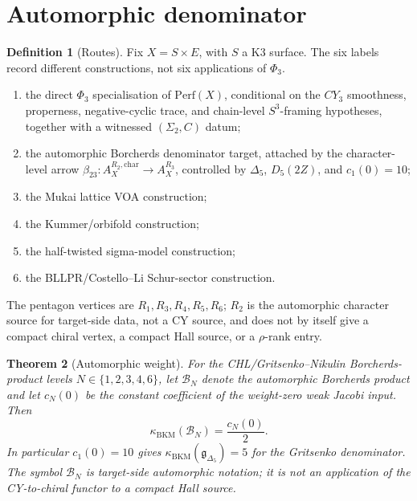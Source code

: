 \documentclass[11pt]{amsart}
\providecommand{\Perf}{\mathrm{Perf}}
\newtheorem{theorem}{Theorem}
\theoremstyle{definition}
\newtheorem{definition}[theorem]{Definition}
\theoremstyle{remark}
\begin{document}
\section{Automorphic denominator}

\begin{definition}[Routes]
Fix \(X=S\times E\), with \(S\) a K3 surface. The six labels record
different constructions, not six applications of \(\Phi_3\).
\begin{enumerate}
\item[\(R_1\)] the direct \(\Phi_3\) specialisation of \(\Perf(X)\),
conditional on the \(CY_3\) smoothness, properness, negative-cyclic trace,
and chain-level \(S^3\)-framing hypotheses, together with a witnessed
\((\Sigma_2,C)\) datum;
\item[\(R_2\)] the automorphic Borcherds denominator target, attached by
the character-level arrow
\(\beta_{23}:A_X^{R_2,\mathrm{char}}\to A_X^{R_3}\), controlled by
\(\Delta_5\), \(D_5(2Z)\), and \(c_1(0)=10\);
\item[\(R_3\)] the Mukai lattice VOA construction;
\item[\(R_4\)] the Kummer/orbifold construction;
\item[\(R_5\)] the half-twisted sigma-model construction;
\item[\(R_6\)] the BLLPR/Costello--Li Schur-sector construction.
\end{enumerate}
The pentagon vertices are \(R_1,R_3,R_4,R_5,R_6\); \(R_2\) is the
automorphic character source for target-side data, not a CY source, and
does not by itself give a compact chiral vertex, a compact Hall source, or
a \(\rho\)-rank entry.
\end{definition}

\begin{theorem}[Automorphic weight]
For the CHL/Gritsenko--Nikulin Borcherds-product levels
\(N\in\{1,2,3,4,6\}\), let \(\mathcal B_N\) denote the automorphic
Borcherds product and let \(c_N(0)\) be the constant coefficient of the
weight-zero weak Jacobi input. Then
\[
        \kappa_{\mathrm{BKM}}(\mathcal B_N)=\frac{c_N(0)}{2}.
\]
In particular \(c_1(0)=10\) gives
\(\kappa_{\mathrm{BKM}}(\mathfrak g_{\Delta_5})=5\) for the Gritsenko
denominator. The symbol \(\mathcal B_N\) is target-side automorphic
notation; it is not an application of the CY-to-chiral functor to a compact
Hall source.
\end{theorem}
\end{document}
